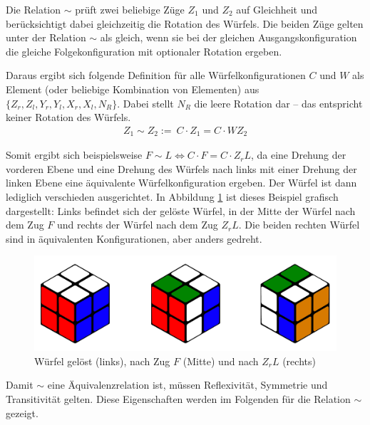 \documentclass[12pt,a4paper, usenames, dvipsnames]{article}
\theoremstyle{mystyle}
\theoremstyle{definition}
\begin{document}
Die Relation $\sim$ prüft zwei beliebige Züge $Z_1$ und $Z_2$ auf Gleichheit und berücksichtigt dabei gleichzeitig die Rotation des Würfels. Die beiden Züge gelten unter der Relation $\sim$ als gleich, wenn sie bei der gleichen Ausgangskonfiguration die gleiche Folgekonfiguration mit optionaler Rotation ergeben.

Daraus ergibt sich folgende Definition für alle Würfelkonfigurationen $C$ und $W$ als Element (oder beliebige Kombination von Elementen) aus $\{{Z_r}, {Z_l}, {Y_r}, {Y_l}, {X_r}, {X_l}, N_R\}$. Dabei stellt $N_R$ die leere Rotation dar -- das entspricht keiner Rotation des Würfels. 
\begin{align*}
Z_1 \sim Z_2 := \ C \cdot Z_1 = C \cdot WZ_2
\end{align*}

Somit ergibt sich beispielsweise $F \sim L \Leftrightarrow C \cdot F = C \cdot Z_rL$, da eine Drehung der vorderen Ebene und eine Drehung des Würfels nach links mit einer Drehung der linken Ebene eine äquivalente Würfelkonfiguration ergeben. Der Würfel ist dann lediglich verschieden ausgerichtet. 
In Abbildung \ref{Abbildung_GelöstnachFnachZL} ist dieses Beispiel grafisch dargestellt: Links befindet sich der gelöste Würfel, in der Mitte der Würfel nach dem Zug $F$ und rechts der Würfel nach dem Zug $Z_rL$. Die beiden rechten Würfel sind in äquivalenten Konfigurationen, aber anders gedreht.
\begin{figure}[h]
\centering
\includegraphics[scale=0.15]{3_wuerfel.png}
\caption[Würfel gelöst, nach Zug $F$ und nach $Z_rL$]{Würfel gelöst (links), nach Zug $F$ (Mitte) und nach $Z_rL$ (rechts)}
\label{Abbildung_GelöstnachFnachZL}
\end{figure}

Damit $\sim$ eine Äquivalenzrelation ist, müssen Reflexivität, Symmetrie und Transitivität gelten. Diese Eigenschaften werden im Folgenden für die Relation $\sim$ gezeigt.
\end{document}
